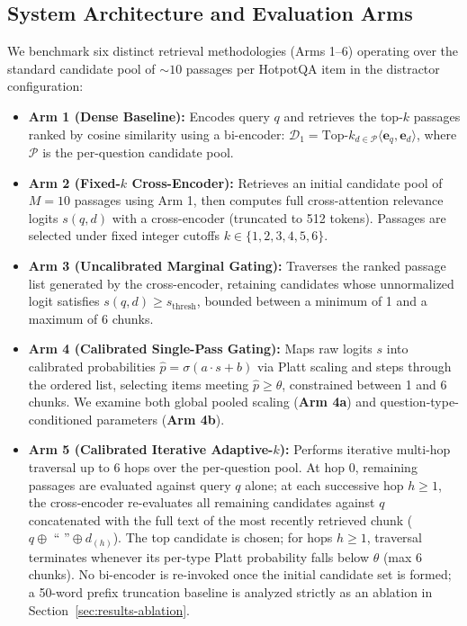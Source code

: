 \documentclass[conference]{IEEEtran}
\begin{document}
\subsection{System Architecture and Evaluation Arms}
We benchmark six distinct retrieval methodologies (Arms 1--6) operating over the standard candidate pool of $\sim 10$ passages per HotpotQA item in the distractor configuration:
\begin{itemize}
    \item \textbf{Arm 1 (Dense Baseline):} Encodes query $q$ and retrieves the top-$k$ passages ranked by cosine similarity using a bi-encoder: $\mathcal{D}_1 = \text{Top-}k_{d \in \mathcal{P}} \langle \mathbf{e}_q, \mathbf{e}_d \rangle$, where $\mathcal{P}$ is the per-question candidate pool.
    \item \textbf{Arm 2 (Fixed-$k$ Cross-Encoder):} Retrieves an initial candidate pool of $M=10$ passages using Arm 1, then computes full cross-attention relevance logits $s(q, d)$ with a cross-encoder (truncated to 512 tokens). Passages are selected under fixed integer cutoffs $k \in \{1, 2, 3, 4, 5, 6\}$.
    \item \textbf{Arm 3 (Uncalibrated Marginal Gating):} Traverses the ranked passage list generated by the cross-encoder, retaining candidates whose unnormalized logit satisfies $s(q, d) \ge s_{\text{thresh}}$, bounded between a minimum of 1 and a maximum of 6 chunks.
    \item \textbf{Arm 4 (Calibrated Single-Pass Gating):} Maps raw logits $s$ into calibrated probabilities $\hat{p} = \sigma(a \cdot s + b)$ via Platt scaling and steps through the ordered list, selecting items meeting $\hat{p} \ge \theta$, constrained between 1 and 6 chunks. We examine both global pooled scaling (\textbf{Arm 4a}) and question-type-conditioned parameters (\textbf{Arm 4b}).
    \item \textbf{Arm 5 (Calibrated Iterative Adaptive-$k$):} Performs iterative multi-hop traversal up to 6 hops over the per-question pool. At hop 0, remaining passages are evaluated against query $q$ alone; at each successive hop $h \ge 1$, the cross-encoder re-evaluates all remaining candidates against $q$ concatenated with the full text of the most recently retrieved chunk ($q \oplus \text{ `` ''} \oplus d_{(h)}$). The top candidate is chosen; for hops $h \ge 1$, traversal terminates whenever its per-type Platt probability falls below $\theta$ (max 6 chunks). No bi-encoder is re-invoked once the initial candidate set is formed; a 50-word prefix truncation baseline is analyzed strictly as an ablation in Section~\ref{sec:results-ablation}.

\end{itemize}
\end{document}
